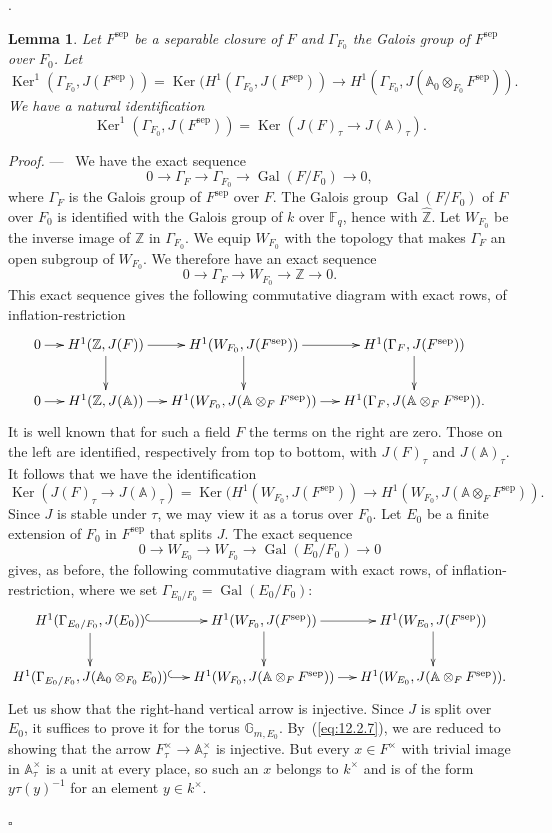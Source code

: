 \documentclass[12pt,a4paper,oneside,english,leqno]{smfart}
\makeatletter
\numberwithin{equation}{subsection}
\newcounter{theo}
\numberwithin{theo}{subsection}
\newenvironment{paragr}[1][]{\medskip\refstepcounter{subsection}%
  \par\noindent\hspace*{\parindent}\thesubsection.\ \emph{#1}%
  \@ifundefined{@empty}{}{}\ignorespaces}{\medskip}
\theoremstyle{plain}
\newtheorem{lemma}[theo]{Lemma}
\theoremstyle{definition}
\theoremstyle{remark}
\newenvironment{preuve}[1][]{\medskip\noindent\textit{Proof.} #1 ---\ }%
  {\hfill\ensuremath{\square}\medskip}
\DeclareMathOperator{\Gal}{Gal}
\DeclareMathOperator{\Ker}{Ker}
\DeclareMathOperator{\sep}{sep}
\newcommand{\ZZ}{\mathbb{Z}}
\newcommand{\AAA}{\mathbb{A}}
\newcommand{\Fq}{\mathbb{F}_q}
\newcommand{\Ga}{\Gamma}
\makeatother
\begin{document}
\begin{paragr}
\begin{lemma}\label{thm:12.2.5}
Let $F^{\sep}$ be a separable closure of $F$ and $\Ga_{F_0}$ the Galois group of $F^{\sep}$ over $F_0$. Let
$$
\Ker^1(\Ga_{F_0},J(F^{\sep}))=\Ker(H^1(\Ga_{F_0},J(F^{\sep}))\to H^1(\Ga_{F_0},J(\AAA_0\otimes_{F_0}F^{\sep})).
$$
We have a natural identification
$$
\Ker^1(\Ga_{F_0},J(F^{\sep}))=\Ker(J(F)_\tau\to J(\AAA)_\tau).
$$
\end{lemma}

\begin{preuve}
We have the exact sequence
$$
0\longrightarrow\Ga_F\longrightarrow\Ga_{F_0}\longrightarrow \Gal(F/F_0)\longrightarrow 0,
$$
where $\Ga_F$ is the Galois group of $F^{\sep}$ over $F$. The Galois group $\Gal(F/F_0)$ of $F$ over $F_0$ is identified with the Galois group of $k$ over $\Fq$, hence with $\widehat{\ZZ}$. Let $W_{F_0}$ be the inverse image of $\ZZ$ in $\Ga_{F_0}$. We equip $W_{F_0}$ with the topology that makes $\Ga_F$ an open subgroup of $W_{F_0}$. We therefore have an exact sequence
$$
0\longrightarrow\Ga_F\longrightarrow W_{F_0}\longrightarrow\ZZ \longrightarrow 0.
$$
This exact sequence gives the following commutative diagram with exact rows, of inflation-restriction
$$
\xymatrix@C=1.1pc{ 0\ar[r] & H^1(\ZZ,J(F))\ar[r]\ar[d] & H^1(W_{F_0},J(F^{\sep}))\ar[r]\ar[d] &
H^1(\Ga_F,J(F^{\sep}))\ar[d]\\
0\ar[r] & H^1(\ZZ,J(\AAA))\ar[r] & H^1(W_{F_0},J(\AAA\otimes_F F^{\sep}))\ar[r] & H^1(\Ga_F,J(\AAA\otimes_F F^{\sep})). }
$$
It is well known that for such a field $F$ the terms on the right are zero. Those on the left are identified, respectively from top to bottom, with $J(F)_\tau$ and $J(\AAA)_\tau$. It follows that we have the identification
\begin{equation}\label{eq:12.2.7}
\Ker(J(F)_\tau\to J(\AAA)_\tau)=\Ker(H^1(W_{F_0},J(F^{\sep}))\to
H^1(W_{F_0},J(\AAA\otimes_F F^{\sep})).
\end{equation}
Since $J$ is stable under $\tau$, we may view it as a torus over $F_0$. Let $E_0$ be a finite extension of $F_0$ in $F^{\sep}$ that splits $J$. The exact sequence
$$
0\longrightarrow W_{E_0}\longrightarrow W_{F_0}\longrightarrow \Gal(E_0/F_0)\longrightarrow 0
$$
gives, as before, the following commutative diagram with exact rows, of inflation-restriction, where we set $\Ga_{E_0/F_0}=\Gal(E_0/F_0)$:
$$
\xymatrix@C=1.1pc{ H^1(\Ga_{E_0/F_0},J(E_0))\ar@{^{(}->}[r]\ar[d] & H^1(W_{F_0},J(F^{\sep}))\ar[r]\ar[d] &
H^1(W_{E_0},J(F^{\sep}))\ar[d]\\
H^1(\Ga_{E_0/F_0},J(\AAA_0\otimes_{F_0}E_0))\ar@{^{(}->}[r] & H^1(W_{F_0},J(\AAA\otimes_F F^{\sep}))\ar[r] & H^1(W_{E_0},J(\AAA\otimes_F F^{\sep})). }
$$
Let us show that the right-hand vertical arrow is injective. Since $J$ is split over $E_0$, it suffices to prove it for the torus $\mathbb{G}_{m,E_0}$. By~(\ref{eq:12.2.7}), we are reduced to showing that the arrow $F_\tau^\times\to\AAA_\tau^\times$ is injective. But every $x\in F^\times$ with trivial image in $\AAA_\tau^\times$ is a unit at every place, so such an $x$ belongs to $k^\times$ and is of the form $y\tau(y)^{-1}$ for an element $y\in k^\times$.


\end{preuve}
\end{paragr}
\end{document}
